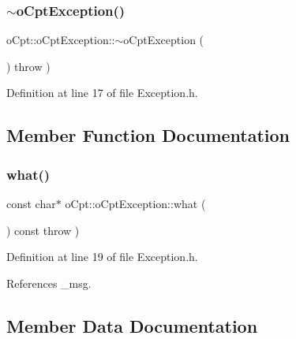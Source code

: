 \subsubsection{\texorpdfstring{$\sim$o\+Cpt\+Exception()}{~oCptException()}}
{\footnotesize\ttfamily o\+Cpt\+::o\+Cpt\+Exception\+::$\sim$o\+Cpt\+Exception (\begin{DoxyParamCaption}{ }\end{DoxyParamCaption}) throw  ) \hspace{0.3cm}{\ttfamily [inline]}}



Definition at line 17 of file Exception.\+h.



\subsection{Member Function Documentation}
\hypertarget{classo_cpt_1_1o_cpt_exception_ac2588bcada015842a63ed4b41866228e}{}\label{classo_cpt_1_1o_cpt_exception_ac2588bcada015842a63ed4b41866228e} 
\subsubsection{\texorpdfstring{what()}{what()}}
{\footnotesize\ttfamily const char$\ast$ o\+Cpt\+::o\+Cpt\+Exception\+::what (\begin{DoxyParamCaption}{ }\end{DoxyParamCaption}) const throw  ) \hspace{0.3cm}{\ttfamily [inline]}}



Definition at line 19 of file Exception.\+h.



References \+\_\+msg.



\subsection{Member Data Documentation}
\hypertarget{classo_cpt_1_1o_cpt_exception_a9d4c556dda3f8143c9aeef2817ee254c}{}\label{classo_cpt_1_1o_cpt_exception_a9d4c556dda3f8143c9aeef2817ee254c} 
